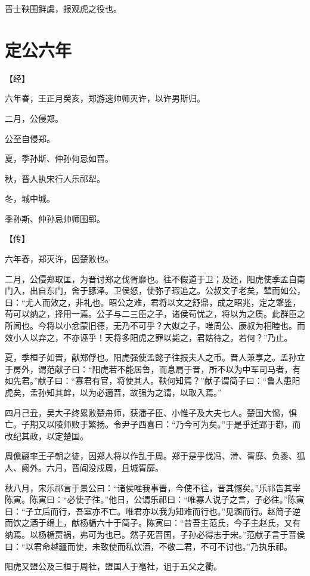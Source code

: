 \documentclass[a4paper,12pt,UTF8,twoside]{ctexbook}
\begin{document}
晋士鞅围鲜虞，报观虎之役也。

\chapter{定公六年}


【经】

六年春，王正月癸亥，郑游速帅师灭许，以许男斯归。

二月，公侵郑。

公至自侵郑。

夏，季孙斯、仲孙何忌如晋。

秋，晋人执宋行人乐祁犁。

冬，城中城。

季孙斯、仲孙忌帅师围郓。

【传】

六年春，郑灭许，因楚败也。

二月，公侵郑取匡，为晋讨郑之伐胥靡也。往不假道于卫；及还，阳虎使季孟自南门入，出自东门，舍于豚泽。卫侯怒，使弥子瑕追之。公叔文子老矣，辇而如公，曰：“尤人而效之，非礼也。昭公之难，君将以文之舒鼎，成之昭兆，定之鞶鉴，苟可以纳之，择用一焉。公子与二三臣之子，诸侯苟忧之，将以为之质。此群臣之所闻也。今将以小忿蒙旧德，无乃不可乎？大姒之子，唯周公、康叔为相睦也。而效小人以弃之，不亦诬乎！天将多阳虎之罪以毙之，君姑待之，若何？”乃止。

夏，季桓子如晋，献郑俘也。阳虎强使孟懿子往报夫人之币。晋人兼享之。孟孙立于房外，谓范献子曰：“阳虎若不能居鲁，而息肩于晋，所不以为中军司马者，有如先君。”献子曰：“寡君有官，将使其人。鞅何知焉？”献子谓简子曰：“鲁人患阳虎矣，孟孙知其衅，以为必適晋，故强为之请，以取入焉。”

四月己丑，吴大子终累败楚舟师，获潘子臣、小惟子及大夫七人。楚国大惕，惧亡。子期又以陵师败于繁扬。令尹子西喜曰：“乃今可为矣。”于是乎迁郢于鄀，而改纪其政，以定楚国。

周儋翩率王子朝之徒，因郑人将以作乱于周。郑于是乎伐冯、滑、胥靡、负黍、狐人、阙外。六月，晋阎没戍周，且城胥靡。

秋八月，宋乐祁言于景公曰：“诸侯唯我事晋，今使不往，晋其憾矣。”乐祁告其宰陈寅。陈寅曰：“必使子往。”他日，公谓乐祁曰：“唯寡人说子之言，子必往。”陈寅曰：“子立后而行，吾室亦不亡。唯君亦以我为知难而行也。”见溷而行。赵简子逆而饮之酒于绵上，献杨楯六十于简子。陈寅曰：“昔吾主范氏，今子主赵氏，又有纳焉。以杨楯贾祸，弗可为也已。然子死晋国，子孙必得志于宋。”范献子言于晋侯曰：“以君命越疆而使，未致使而私饮酒，不敬二君，不可不讨也。”乃执乐祁。

阳虎又盟公及三桓于周社，盟国人于亳社，诅于五父之衢。
\end{document}
